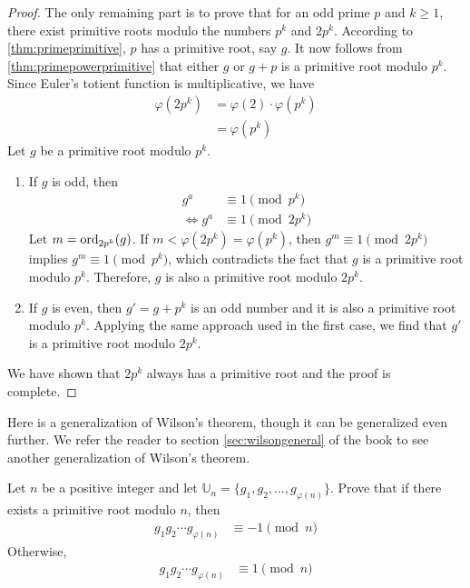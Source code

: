 \documentclass{subfile}
\begin{document}
\begin{proof}
		The only remaining part is to prove that for an odd prime $p$ and $k \geq 1$, there exist primitive roots modulo the numbers $p^k$ and $2p^k$. According to \autoref{thm:primeprimitive}, $p$ has a primitive root, say $g$. It now follows from \autoref{thm:primepowerprimitive} that either $g$ or $g+p$ is a primitive root modulo $p^k$. Since Euler's totient function is multiplicative, we have
			\begin{align*}
				\varphi(2p^k)
					& = \varphi(2)\cdot \varphi(p^k)\\
					& = \varphi(p^k)
			\end{align*}
		Let $g$ be a primitive root modulo $p^k$.
		\begin{enumerate}
			\item If $g$ is odd, then
			\begin{align*}
				g^a
					& \equiv 1 \pmod{p^k}\\
				\iff g^a
					& \equiv 1 \pmod{2p^k}
			\end{align*}
			Let $m = \operatorname{ord}_{2p^k}(g)$. If $m<\varphi(2p^k)=\varphi(p^k)$, then $g^m \equiv 1\pmod{2p^k}$ implies $g^m \equiv 1\pmod{p^k}$, which contradicts the fact that $g$ is a primitive root modulo $p^k$. Therefore, $g$ is also a primitive root modulo $2p^k$.
			\item If $g$ is even, then $g'=g+p^k$ is an odd number and it is also a primitive root modulo $p^k$. Applying the same approach used in the first case, we find that $g'$ is a primitive root modulo $2p^k$.
		\end{enumerate}
		We have shown that $2p^k$ always has a primitive root and the proof is complete.
	\end{proof}

Here is a generalization of Wilson's theorem, though it can be generalized even further. We refer the reader to section \eqref{sec:wilsongeneral} of the book to see another generalization of Wilson's theorem.
	\begin{problem}\label{thm:genWilson}
		Let $n$ be a positive integer and let $\mathbb U_n = \{g_1, g_2, \ldots, g_{\varphi(n)}\}$. Prove that if there exists a primitive root modulo $n$, then
			\begin{align*}
				g_1g_2\cdots g_{\varphi(n)}
					& \equiv-1\pmod n
			\end{align*}
		Otherwise,
			\begin{align*}
				g_1g_2\cdots g_{\varphi(n)}
					& \equiv1\pmod n
			\end{align*}
	\end{problem}
\end{document}
